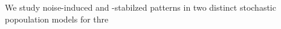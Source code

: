 \documentclass{article}
\begin{document}
    We study noise-induced and -stabilzed patterns in two distinct stochastic popoulation
    models for thre                                   
\end{document}
